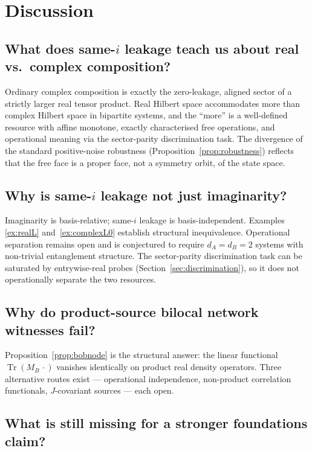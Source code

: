 \documentclass[a4paper,onecolumn,noarxiv]{quantumarticle}
\theoremstyle{plain}
\theoremstyle{definition}
\theoremstyle{remark}
\newcommand{\Mop}{M}
\newcommand{\Tr}{\operatorname{Tr}}
\begin{document}
\section{Discussion}
\label{sec:discussion}

\subsection{What does same-$i$ leakage teach us about real vs.\ complex composition?}

Ordinary complex composition is exactly the zero-leakage, aligned sector of a
strictly larger real tensor product. Real Hilbert space accommodates more than
complex Hilbert space in bipartite systems, and the ``more'' is a well-defined
resource with affine monotone, exactly characterised free operations, and operational
meaning via the sector-parity discrimination task. The divergence of the standard
positive-noise robustness (Proposition~\ref{prop:robustness}) reflects that the free
face is a proper face, not a symmetry orbit, of the state space.

\subsection{Why is same-$i$ leakage not just imaginarity?}

Imaginarity is basis-relative; same-$i$ leakage is basis-independent. Examples~%
\ref{ex:realL} and~\ref{ex:complexL0} establish structural inequivalence. Operational
separation remains open and is conjectured to require $d_A=d_B=2$ systems with
non-trivial entanglement structure. The sector-parity discrimination task can be
saturated by entrywise-real probes (Section~\ref{sec:discrimination}), so it does
not operationally separate the two resources.

\subsection{Why do product-source bilocal network witnesses fail?}

Proposition~\ref{prop:bobnode} is the structural answer: the linear functional
$\Tr(\Mop_B\,\cdot)$ vanishes identically on product real density operators.
Three alternative routes exist --- operational independence, non-product correlation
functionals, $J$-covariant sources --- each open.

\subsection{What is still missing for a stronger foundations claim?}
\end{document}
